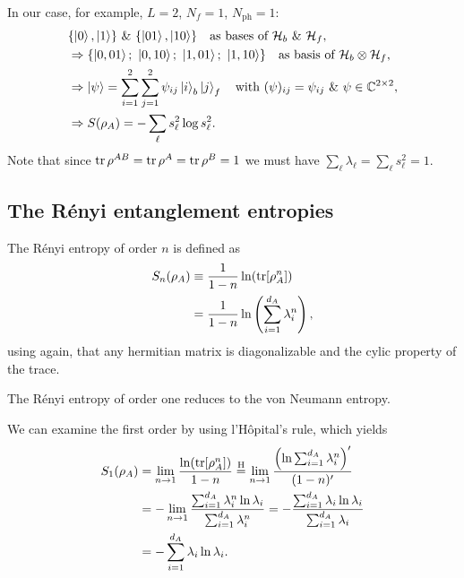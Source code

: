 \documentclass[../../main.tex]{subfiles}
\begin{document}
In our case, for example, $L=2$, $N_f=1$, $N_\mathrm{ph}=1$:
\begin{align}
& \{\left\lvert 0 \right\rangle,\left\lvert 1 \right\rangle\}\ \&\ \{\left\lvert 01 \right\rangle,\left\lvert 10 \right\rangle\}
\quad\text{as bases of }\mathcal H_b\ \&\ \mathcal H_f,\\
&\Rightarrow\{\left\lvert 0, 01 \right\rangle;\ \left\lvert 0, 10 \right\rangle;\ \left\lvert 1, 01 \right\rangle;\ \left\lvert 1, 10 \right\rangle\}
\quad\text{as basis of }\mathcal H_b\otimes\mathcal H_f,\\
&\Rightarrow\left\lvert \psi \right\rangle=\sum_{i=1}^{2}\sum_{j=1}^{2}\psi_{ij}\left\lvert i \right\rangle_b\left\lvert j \right\rangle_f
\quad\text{with }(\psi)_{ij}=\psi_{ij}\ \&\ \psi\in\mathbb C^{2\times2},\\
&\Rightarrow S(\rho_A)=-\sum_\ell s_\ell^2\log s_\ell^2.
\end{align}
Note that since $\operatorname{tr}\rho^{AB}=\operatorname{tr}\rho^A=\operatorname{tr}\rho^B=1$ we must have
$\sum_\ell\lambda_\ell=\sum_\ell s_\ell^2=1$.

\subsection{The Rényi entanglement entropies}

The Rényi entropy of order $n$ is defined as
\begin{align}
      S_n(\rho_A) &\equiv \frac{1}{1-n} \ln (\operatorname{tr}[\rho_A^n]) \\
      &=  \frac{1}{1-n} \ln \left( \sum_{i=1}^{d_A} \lambda_i^n \right),
\end{align}
using again, that any hermitian matrix is diagonalizable and the cylic property of the trace.

\begin{claim}
The Rényi entropy of order one reduces to the von Neumann entropy.
\end{claim}
\begin{claimproof}
      We can examine the first order by using l'Hôpital's rule, which yields
      \begin{align*}
            S_1(\rho_A) &= \lim_{n \rightarrow 1} \frac{\ln (\operatorname{tr}[\rho_A^n])}{1-n} 
            \overset{\mathrm{H}}{=} \lim_{n \rightarrow 1} \frac{\left( \ln \sum_{i=1}^{d_A} \lambda_i^n \right)'}{(1-n)'} \\
            &= - \lim_{n \rightarrow 1} \frac{\sum_{i=1}^{d_A} \lambda_i^n \ln \lambda_i }{\sum_{i=1}^{d_A} \lambda_i^n} 
            = - \frac{\sum_{i=1}^{d_A} \lambda_i \ln \lambda_i }{\sum_{i=1}^{d_A} \lambda_i} \\
            &= - \sum_{i=1}^{d_A} \lambda_i \ln \lambda_i .
      \end{align*}
\end{claimproof}
\end{document}
